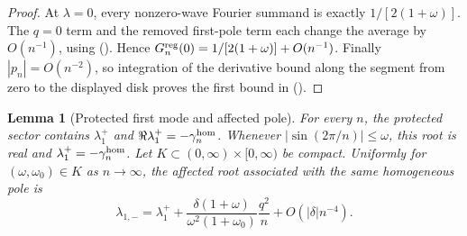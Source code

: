 \documentclass[twoside,10pt]{article}
\numberwithin{equation}{section}
\theoremstyle{slbody}
\newtheorem{lemma}[theorem]{Lemma}
\theoremstyle{definition}
\theoremstyle{remark}
\renewcommand{\eqref}[1]{%
  \textup{{\normalfont(\oldstylenums{\ref{#1}}}\normalfont)}}
\begin{document}
\begin{proof}
At $\lambda=0$, every nonzero-wave Fourier summand is exactly
$1/[2(1+\omega)]$.  The $q=0$ term and the removed first-pole
term each change the average by $O(n^{-1})$, using
\eqref{eq:fixed-small-wave-bounds}.  Hence
$G_n^{\rm reg}(0)=1/[2(1+\omega)]+O(n^{-1})$.
Finally $|p_n|=O(n^{-2})$, so integration of the derivative bound along
the segment from zero to the displayed disk proves the first bound in
\eqref{eq:fixed-regular-green-bounds}.
\end{proof}

\begin{lemma}[Protected first mode and affected pole]
\label{lem:gap-pole}
For every $n$, the protected sector contains $\lambda_1^+$ and
$\Re\lambda_1^+=-\gamma_n^{\rm hom}$.  Whenever
$|\sin(2\pi/n)|\le\omega$, this root is real and
$\lambda_1^+=-\gamma_n^{\rm hom}$.  Let
$K\subset(0,\infty)\times[0,\infty)$ be compact.  Uniformly for
$(\omega,\omega_0)\in K$ as $n\to\infty$, the affected root associated
with the same homogeneous pole is
\begin{equation}\label{eq:affected-gap-shift}
 \lambda_{1,-}=\lambda_1^+
 +\frac{\delta(1+\omega)}{\omega^2(1+\omega_0)}
       \frac{q^2}{n}+O(|\delta|n^{-4}).
\end{equation}
\end{lemma}
\end{document}
